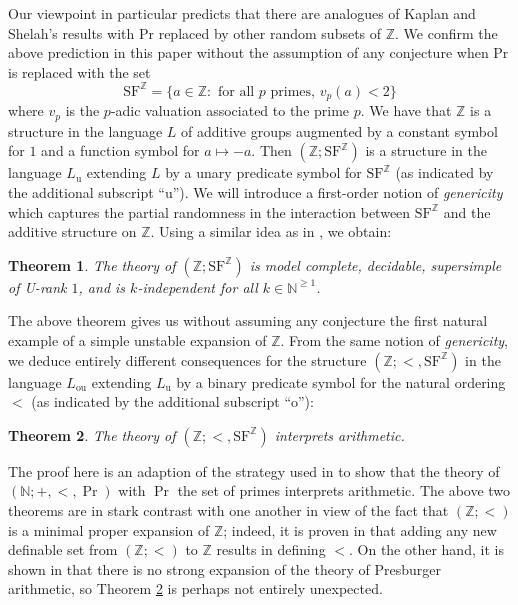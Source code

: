 \documentclass[letterpaper]{amsart}
\newcommand{\nn}{\mathbb{N}}
\newcommand{\zz}{\mathbb{Z}}
\newcommand{\SF}{\mathrm{SF}^\zz}
\newtheorem{thm}{Theorem}[section]
\begin{document}
\medskip \noindent Our viewpoint in particular predicts that there are analogues of Kaplan and Shelah's results with $\textrm{Pr}$ replaced by other random subsets of $\zz$. We confirm the above prediction in this paper without the assumption of any conjecture when $\textrm{Pr}$ is replaced with the set $$\SF = \{ a \in \zz : \text{ for all } p \text{ primes, }  v_p(a) < 2 \}$$ where $v_p$ is the $p$-adic valuation associated to the prime $p$. 
We have that $\zz$ is a structure in the language $L$ of additive groups augmented by  a constant symbol for $1$  and a function symbol for $a \mapsto -a$. Then $(\zz;\SF)$  is a structure in the language $L_{\mathrm{u}}$ extending $L$ by a unary predicate symbol for $\SF$ (as indicated by the additional subscript ``u''). We will introduce a first-order notion of {\it genericity} which captures the partial randomness in the interaction between $\SF$ and the additive structure on $\zz$. Using a similar idea as in \cite{ShelahKaplan},  we obtain:

\begin{thm} \label{structure1}
The theory of $(\zz; \SF)$ is model complete, decidable, supersimple of U-rank $1$, and is $k$-independent for all $k \in \nn^{\geq 1}$.
\end{thm}

\noindent The above theorem gives us without assuming any conjecture the first natural example of a simple unstable expansion of $\zz$. From the same notion of {\it genericity}, we deduce entirely different consequences  for the structure $(\zz; <, \SF)$ in the language $L_\mathrm{ou}$ extending $L_\mathrm{u}$ by a binary predicate symbol for the natural ordering $<$ (as indicated by the additional subscript ``o''):

\begin{thm} \label{structure2}
The theory of $(\zz; <, \SF)$ interprets arithmetic.
\end{thm}
\noindent The proof here is an adaption of the strategy used in \cite{BJW} to show that the theory of $(\nn; +, <, \Pr)$ with $\Pr$ the set of primes interprets arithmetic.  The above two theorems are in stark contrast  with one another in view of the fact that $(\zz;<)$ is a minimal proper expansion of $\zz$; indeed, it is proven in \cite{Gabe} that adding any new definable set from $(\zz;<)$ to $\zz$ results in defining $<$. On the other hand, it is shown in \cite{DolichGoodrick} that there is no strong expansion of the theory of Presburger arithmetic, so  Theorem \ref{structure2} is perhaps not entirely unexpected.  
\medskip
\end{document}
